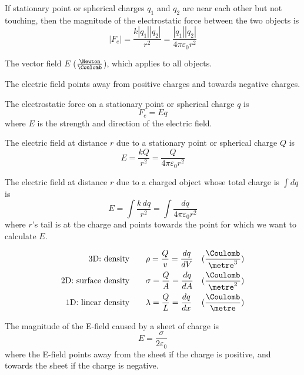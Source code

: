 \begin{namedlaw}
  If stationary point or spherical charges $q_1$ and $q_2$ are near each other but not touching, then the magnitude of the electrostatic force between the two objects is
  \[
    |F_e| = \frac{k |q_1| |q_2|}{r^2} = \frac{|q_1| |q_2|}{4 \pi \varepsilon_0 r^2}
  \]
\end{namedlaw}

\begin{definition}
  The vector field $E$ ($\frac{\Newton}{\Coulomb}$), which applies to all objects.

  The electric field points away from positive charges and towards negative charges.
\end{definition}

\begin{law}
  The electrostatic force on a stationary point or spherical charge $q$ is 
  \[
    F_e = Eq
  \]
  where $E$ is the strength and direction of the electric field.
\end{law}

\begin{law}
  The electric field at distance $r$ due to a stationary point or spherical charge $Q$ is
  \[
    E = \frac{kQ}{r^2} = \frac{Q}{4\pi\varepsilon_0 r^2}
  \]

  The electric field at distance $r$ due to a charged object whose total charge is $\int dq$ is
  \[
    E = \int \frac{k \,dq}{r^2} = \int \frac{dq}{4 \pi \varepsilon_0 r^2}
  \]
  where $r$'s tail is at the charge and points towards the point for which we want to calculate $E$.
\end{law}

\begin{definition}
  \begin{align*}
    \text{3D: density} \qquad & \rho = \frac{Q}{v} = \frac{dq}{dV} & (\frac{\Coulomb}{\metre^3}) \\
    \text{2D: surface density} \qquad & \sigma = \frac{Q}{A} = \frac{dq}{dA} & (\frac{\Coulomb}{\metre^2}) \\
    \text{1D: linear density} \qquad & \lambda = \frac{Q}{L} = \frac{dq}{dx} & (\frac{\Coulomb}{\metre}) \\
  \end{align*}
\end{definition}

\begin{example}
  The magnitude of the E-field caused by a sheet of charge is
  \[
    E = \frac{\sigma}{2\varepsilon_0}
  \]
  where the E-field points away from the sheet if the charge is positive, and towards the sheet if the charge is negative.
\end{example}

